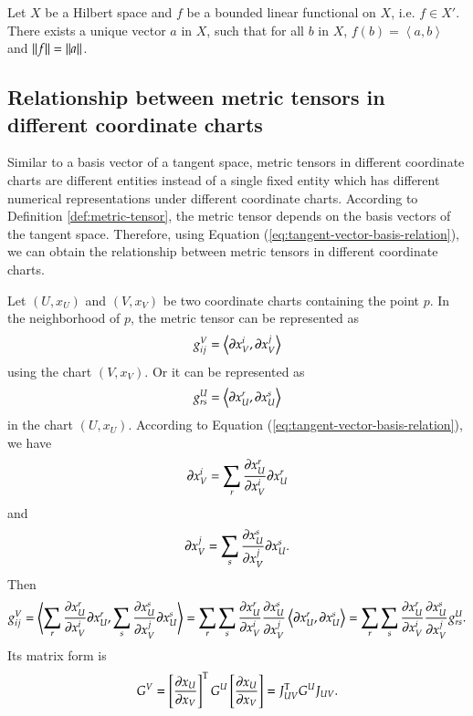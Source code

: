 \documentclass[11pt, a4paper]{book}
\begin{document}
\begin{Theorem}
  \label{theo:riesz-representation}
  Let $X$ be a Hilbert space and $f$ be a bounded linear functional on $X$, i.e.
  $f \in X'$. There exists a unique vector $a$ in $X$, such that for all $b$ in $X$,
  $f(b) = \left\langle a, b \right\rangle$ and $\lVert f\rVert = \lVert a\rVert$.
\end{Theorem}

\subsection{Relationship between metric tensors in different coordinate charts}

Similar to a basis vector of a tangent space, metric tensors in different coordinate
charts are different entities instead of a single fixed entity which has different
numerical representations under different coordinate charts. According to Definition
\ref{def:metric-tensor}, the metric tensor depends on the basis vectors of the tangent
space. Therefore, using Equation (\ref{eq:tangent-vector-basis-relation}), we can obtain
the relationship between metric tensors in different coordinate charts.

Let $(U,x_U)$ and $(V,x_V)$ be two coordinate charts containing the point $p$. In the
neighborhood of $p$, the metric tensor can be represented as
\begin{equation*}
  g_{ij}^V = \left\langle \boldsymbol{\partial}x_V^i, \boldsymbol{\partial}x_V^j \right\rangle
\end{equation*}
using the chart $(V,x_V)$. Or it can be represented as
\begin{equation*}
  g_{rs}^U = \left\langle \boldsymbol{\partial}x_U^r, \boldsymbol{\partial}x_U^s \right\rangle
\end{equation*}
in the chart $(U,x_U)$. According to Equation (\ref{eq:tangent-vector-basis-relation}), we
have
\begin{equation*}
  \boldsymbol{\partial}x_V^i = \sum_r \frac{\partial x_U^r}{\partial x_V^i} \boldsymbol{\partial}x_U^r
\end{equation*}
and
\begin{equation*}
  \boldsymbol{\partial}x_V^j = \sum_s \frac{\partial x_U^s}{\partial x_V^j} \boldsymbol{\partial}x_U^s.
\end{equation*}
Then
\begin{equation}
  \label{eq:metric-tensor-transformation}
  g_{ij}^V = \left\langle \sum_r \frac{\partial x_U^r}{\partial x_V^i} \boldsymbol{\partial}x_U^r,
    \sum_s \frac{\partial x_U^s}{\partial x_V^j} \boldsymbol{\partial}x_U^s \right\rangle =
  \sum_r\sum_s \frac{\partial x_U^r}{\partial x_V^i} \frac{\partial x_U^s}{\partial x_V^j}
  \left\langle \boldsymbol{\partial}x_U^r, \boldsymbol{\partial}x_U^s \right\rangle = \sum_r\sum_s
  \frac{\partial x_U^r}{\partial x_V^i} \frac{\partial x_U^s}{\partial x_V^j} g_{rs}^U.
\end{equation}
Its matrix form is
\begin{equation}
  \label{eq:metric-tensor-transformation-matrix-form}
  G^V = \left[ \frac{\partial x_U}{\partial x_V} \right]^{\mathrm{T}} G^U \left[ \frac{\partial
      x_U}{\partial x_V} \right] = J_{UV}^{\mathrm{T}} G^U J_{UV}.
\end{equation}
\end{document}
